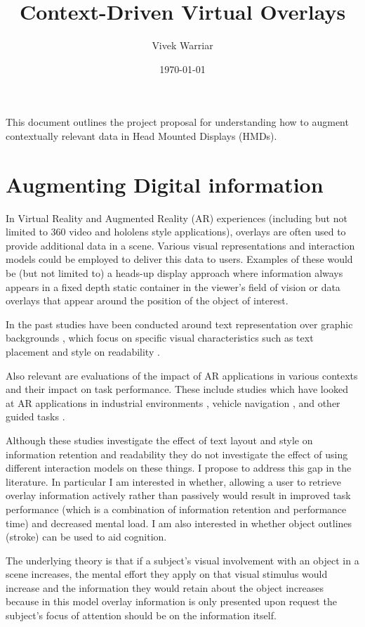 \documentclass{article}
\title{Context-Driven Virtual Overlays}
\author{Vivek Warriar}
\date {\today}
\begin{document}
\maketitle
This document outlines the project proposal for understanding how to augment contextually relevant data in Head Mounted Displays (HMDs).

\section{Augmenting Digital information} \label{Intro}
In Virtual Reality and Augmented Reality (AR) experiences (including but not limited to 360 video and hololens style applications), overlays are often used to provide additional data in a scene. Various  visual representations and interaction models could be employed to deliver this data to users. Examples of these would be (but not limited to) a heads-up display approach where information always appears in a fixed depth static container in the viewer’s field of vision or data overlays that appear around the position of the object of interest. 

In the past studies have been conducted around text representation over graphic backgrounds \cite{Jankowski:2010:ITV:1753326.1753524}, which focus on specific visual characteristics such as text placement and style on readability  \cite{Debernardis6520861,Gattullo6994851}.

Also relevant are evaluations of the impact of AR applications in various contexts and their impact on task performance. These include studies which have looked at AR applications in industrial environments \cite{Tati20171}, vehicle navigation \cite{Large:2017:ALD:3050112.3050114}, and other guided tasks \cite{Smith:2015:VST:2799250.2799291}.

Although these studies investigate the effect of text layout and style on information retention and readability they do not investigate the effect of using different interaction models on these things. I propose to address this gap in the literature. In particular I am interested in whether, allowing a user to retrieve overlay information actively rather than passively would result in improved task performance (which is a combination of information retention and performance time) and decreased mental load. I am also interested in whether object outlines (stroke) can be used to aid cognition.

The underlying theory is that if a subject's visual involvement with an object in a scene increases, the mental effort they apply on that visual stimulus would increase and the information they would retain about the object increases because in this model overlay information is only presented upon request the subject's focus of attention should be on the information itself. 
\end{document}
